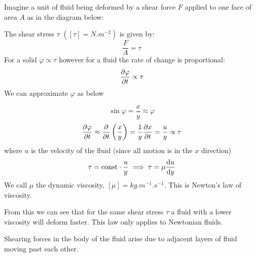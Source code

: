 \documentclass{article}
\begin{document}
    Imagine a unit of fluid being deformed by a shear force \(F\) applied to one face of area \(A\) as in the diagram below:
    \begin{center}
    \end{center}
    The shear stress \(\tau\) \(\left([\tau] = \si{N.m^{-2}}\right)\) is given by:
    \[\frac{F}{A} = \tau\]
    For a solid \(\varphi \propto \tau\) however for a fluid the rate of change is proportional:
    \[\pdv{\varphi}{t} \propto \tau\]
    We can approximate \(\varphi\) as below
    \begin{center}
    \end{center}
    \[\sin\varphi = \frac{x}{y}\approx\varphi\]
    \[\pdv{\varphi}{t} \approx \pdv{t}\left(\frac{x}{y}\right) = \frac{1}{y}\pdv{x}{t}=\frac{u}{y}\propto\tau\]
    where \(u\) is the velocity of the fluid (since all motion is in the \(x\) direction)
    \[\tau=\text{const}\cdot\frac{u}{y}\implies\tau = \mu\dv{u}{y}\]
    We call \(\mu\) the dynamic viscosity, \([\mu] = \si{kg.m^{-1}.s^{-1}}\). This is Newton's law of viscosity.
    
    From this we can see that for the same shear stress \(\tau\) a fluid with a lower viscosity will deform faster. This law only applies to Newtonian fluids.
    
    Shearing forces in the body of the fluid arise due to adjacent layers of fluid moving past each other.
    
\end{document}
